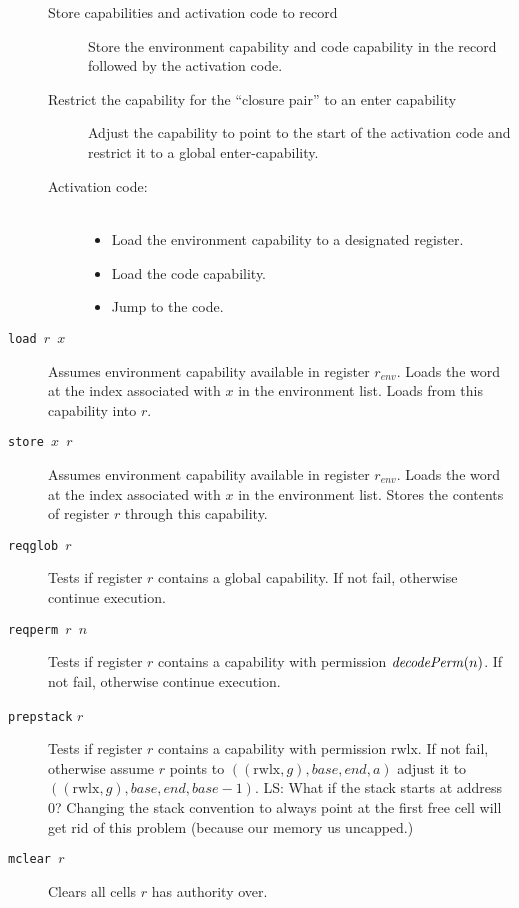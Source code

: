 \documentclass[a4paper]{article}
\newcommand{\forcenewline}{$\phantom{v}$\\}
\newcommand\lau[1]{{\color{purple} \sf \footnotesize {LS: #1}}\\}
\newcommand{\var}[1]{\mathit{#1}}
\newcommand{\gl}{\var{g}}
\newcommand{\addr}{\var{a}}
\newcommand{\start}{\var{base}}
\newcommand{\addrend}{\var{end}}
\newcommand{\plainfun}[2]{
  \ifthenelse{\equal{#2}{}}
  {\mathit{#1}}
  {\mathit{#1}(#2)}
}
\newcommand{\decodePerm}[1]{\plainfun{decodePerm}{#1}}
\newcommand{\plainperm}[1]{\mathrm{#1}}
\newcommand{\rwlx}{\plainperm{rwlx}}
\newcommand{\glob}{\plainperm{global}}
\begin{document}
\begin{description}
\begin{description}
                \item[Store capabilities and activation code to record] Store the environment capability and code capability in the record followed by the activation code. 
                \item[Restrict the capability for the ``closure pair'' to an enter capability] Adjust the capability to point to the start of the activation code and restrict it to a global enter-capability.
                \item[Activation code:] \forcenewline
                  \begin{itemize}
                  \item Load the environment capability to a designated register.
                  \item Load the code capability.
                  \item Jump to the code.
                  \end{itemize}
                \end{description}
              \item[\texttt{load $r$ $x$}] Assumes environment capability available in register $r_{\var{env}}$. Loads the word at the index associated with $x$ in the environment list. Loads from this capability into $r$.
              \item[\texttt{store $x$ $r$}] Assumes environment capability available in register $r_{\var{env}}$. Loads the word at the index associated with $x$ in the environment list. Stores the contents of register $r$ through this capability.
              \item[\texttt{reqglob $r$}] Tests if register $r$ contains a $\glob$ capability. If not fail, otherwise continue execution.
              \item[\texttt{reqperm $r$ $n$}] Tests if register $r$ contains a capability with permission $\decodePerm{n}$. If not fail, otherwise continue execution.
              \item[\texttt{prepstack} $r$] Tests if register $r$ contains a capability with permission $\rwlx$. If not fail, otherwise assume $r$ points to $((\rwlx,\gl),\start,\addrend,\addr)$ adjust it to $((\rwlx,\gl),\start,\addrend,\start - 1)$. 
                \lau{What if the stack starts at address 0? Changing the stack convention to always point at the first free cell will get rid of this problem (because our memory us uncapped.)}
              \item[\texttt{mclear $r$}] Clears all cells $r$ has authority over. 
              \end{description}
\end{document}
